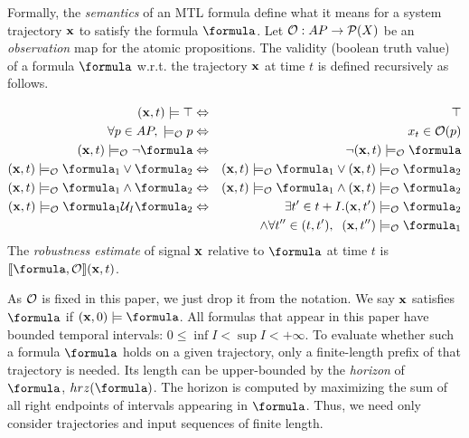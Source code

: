 Formally, the \textit{semantics} of an MTL formula define what it means for a system trajectory $\mathbf{x}$ to satisfy the formula $\formula$.
Let $\mathcal{O}: AP \rightarrow \mathcal{P}(X)$ be an \textit{observation} map for the atomic propositions.
The validity (boolean truth value) of a formula $\formula$ w.r.t. the trajectory $\mathbf{x}$ at time $t$ is defined recursively as follows.
\begin{definition}
	\label{def:boolean sat}
	\begin{eqnarray*}
		\label{eq:boolean sat}
		(\sstraj,t) \models \top &\Leftrightarrow& \top
		\\
		\forall p \in AP, \; \models_\Oc p &\Leftrightarrow& x_t \in \Oc(p)
		\\
		(\sstraj,t) \models_\Oc \neg \formula&\Leftrightarrow& \neg (\sstraj,t) \models_\Oc \formula
		\\
		(\sstraj,t) \models_\Oc \formula_1 \lor \formula_2 &\Leftrightarrow& (\sstraj,t) \models_\Oc \formula_1 \lor (\sstraj,t) \models_\Oc \formula_2
		\\
		(\sstraj,t) \models_\Oc  \formula_1 \land \formula_2&\Leftrightarrow& (\sstraj,t) \models_\Oc \formula_1 \land (\sstraj,t) \models_\Oc \formula_2
		\\
		(\sstraj,t) \models_\Oc \formula_1 \until_I \formula_2 &\Leftrightarrow& \exists t' \in t+I .  (\sstraj,t') \models_\Oc \formula_2  
		\\
		&& \, \land \forall t'' \in (t,t'), \;\; (\sstraj,t'') \models_\Oc \formula_1 
	\end{eqnarray*}
	The \textit{robustness estimate} of signal $\mathbf{x}$ relative to $\formula$ at time $t$ is $\rs{\formula}{\Oc}(\sstraj,t)$.
\end{definition}
As $\mathcal{O}$ is fixed in this paper, we just drop it from the notation.
We say $\mathbf{x}$ satisfies $\formula$ if $(\sstraj,0) \models \formula$.
All formulas that appear in this paper have bounded temporal intervals: $ 0\leq \inf I < \sup I < +\infty$.
To evaluate whether such a formula $\formula$ holds on a given trajectory, only a finite-length prefix of that trajectory is needed.
Its length can be upper-bounded by the \textit{horizon} of $\formula$, $hrz(\formula)$.
The horizon is computed by maximizing the sum of all right endpoints of intervals appearing in $\formula$.
Thus, we need only consider trajectories and input sequences of finite length.

